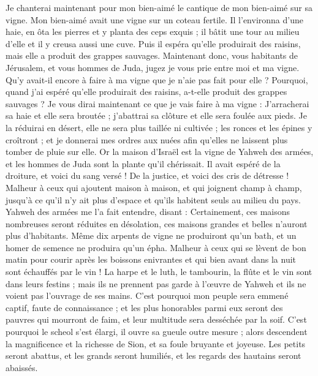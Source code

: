 \begin{multicols}{2}
\VerseOne{}Je chanterai maintenant pour mon bien-aimé le cantique de mon bien-aimé sur sa vigne. Mon bien-aimé avait une vigne sur un coteau fertile.
Il l'environna d'une haie, en ôta les pierres et y planta des ceps exquis ; il bâtit une tour au milieu d'elle et il y creusa aussi une cuve. Puis il espéra qu'elle produirait des raisins, mais elle a produit des grappes sauvages.
Maintenant donc, vous habitants de Jérusalem, et vous hommes de Juda, jugez je vous prie entre moi et ma vigne.
Qu'y avait-il encore à faire à ma vigne que je n'aie pas fait pour elle ? Pourquoi, quand j'ai espéré qu'elle produirait des raisins, a-t-elle produit des grappes sauvages ?
Je vous dirai maintenant ce que je vais faire à ma vigne : J'arracherai sa haie et elle sera broutée ; j'abattrai sa clôture et elle sera foulée aux pieds.
Je la réduirai en désert, elle ne sera plus taillée ni cultivée ; les ronces et les épines y croîtront ; et je donnerai mes ordres aux nuées afin qu'elles ne laissent plus tomber de pluie sur elle.
Or la maison d'Israël est la vigne de Yahweh des armées, et les hommes de Juda sont la plante qu'il chérissait. Il avait espéré de la droiture, et voici du sang versé ! De la justice, et voici des cris de détresse !
Malheur à ceux qui ajoutent maison à maison, et qui joignent champ à champ, jusqu'à ce qu'il n'y ait plus d'espace et qu'ils habitent seuls au milieu du pays.
Yahweh des armées me l'a fait entendre, disant : Certainement, ces maisons nombreuses seront réduites en désolation, ces maisons grandes et belles n'auront plus d'habitants.
Même dix arpents de vigne ne produiront qu'un bath, et un homer de semence ne produira qu'un épha.
Malheur à ceux qui se lèvent de bon matin pour courir après les boissons enivrantes et qui bien avant dans la nuit sont échauffés par le vin !
La harpe et le luth, le tambourin, la flûte et le vin sont dans leurs festins ; mais ils ne prennent pas garde à l'œuvre de Yahweh et ils ne voient pas l'ouvrage de ses mains.
C'est pourquoi mon peuple sera emmené captif, faute de connaissance ; et les plus honorables parmi eux seront des pauvres qui mourront de faim, et leur multitude sera desséchée par la soif.
C'est pourquoi le scheol s'est élargi, il ouvre sa gueule outre mesure ; alors descendent la magnificence et la richesse de Sion, et sa foule bruyante et joyeuse.
Les petits seront abattus, et les grands seront humiliés, et les regards des hautains seront abaissés.

\end{multicols}
